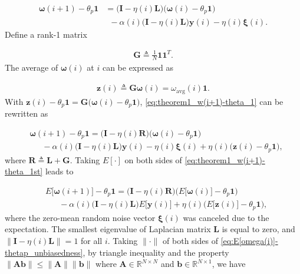 \documentclass[journal]{IEEEtran}
\begin{document}
\vspace{-4mm}
\small
\begin{align}
\bm{\omega}(i+1) - {\theta_p}\mathbf{1} &= \big(\mathbf{I} - \eta(i)\mathbf{L} \big)  \big(\bm{\omega}(i)- {\theta_p}\mathbf{1} \big)\nonumber \\
&\,\,\,- \alpha(i) \big(\mathbf{I} - \eta(i) \mathbf{L}\big)   \mathbf{y}(i) - \eta(i)\bm{\xi}(i).  \label{eq:theorem1_w(i+1)-theta_1}
\end{align}
\normalsize
Define a rank-1 matrix

\vspace{-4mm}
\small
\begin{align}
\mathbf{G} \triangleq \frac{1}{N}\mathbf{1} \mathbf{1}^T. \label{eq:G_definition}
\end{align}
\normalsize
The average of $\bm{\omega}(i)$ at $i$ can be expressed as 

\vspace{-4mm}
\small
\begin{align}
\mathbf{z}(i) \triangleq \mathbf{G} \bm{\omega}(i) = \omega_{\text{avg}}(i)\mathbf{1}. \label{eq:z(i)definition}
\end{align}
\normalsize
With $\mathbf{z}(i)-\theta_p\mathbf{1} = \mathbf{G}\big(\bm{\omega}(i)-\theta_p\mathbf{1}\big)$, \eqref{eq:theorem1_w(i+1)-theta_1} can be rewritten as

\vspace{-4mm}
\small
\begin{align}
&\bm{\omega}(i+1) - {\theta_p}\mathbf{1} = \Big(\mathbf{I} - \eta(i)\mathbf{R} \Big)  \big(\bm{\omega}(i)- {\theta_p}\mathbf{1} \big) \nonumber \\
&\,\,\,\,\,\,\,\,\,- \alpha(i) \Big(\mathbf{I}  - \eta(i) \mathbf{L}\Big)   \mathbf{y}(i) - \eta(i)\bm{\xi}(i) + \eta(i)\big(\mathbf{z}(i)- {\theta_p}\mathbf{1} \big), \label{eq:theorem1_w(i+1)-theta_1st}
\end{align}
\normalsize
where $\mathbf{R} \triangleq \mathbf{L}+\mathbf{G}$. Taking $E\left[\cdot\right]$ on both sides of \eqref{eq:theorem1_w(i+1)-theta_1st} leads to

\vspace{-4mm}
\small
\begin{align}
&E\big[\bm{\omega}(i+1)\big] - {\theta_p}\mathbf{1} = \Big(\mathbf{I} - \eta(i)\mathbf{R}\Big)  \Big(E\big[\bm{\omega}(i)\big] - {\theta_p}\mathbf{1} \Big) \nonumber \\
&\,\,\,\,\,\,\,\,\,\,- \alpha(i) \Big(\mathbf{I} - \eta(i) \mathbf{L}\Big)   E\big[\mathbf{y}(i)\big] +\eta(i) \Big( E\big[\mathbf{z}(i)\big] - \theta_p\mathbf{1}\Big), \label{eq:E[omega(i)]-thetap_unbiasedness}
\end{align}
\normalsize
where the zero-mean random noise vector $\bm{\xi}(i)$ was canceled {}{due to the expectation}. The smallest eigenvalue of Laplacian matrix $\mathbf{L}$ is equal to zero, and $\|\mathbf{I}-\eta(i)\mathbf{L}\|=1$ for all $i$. Taking $\|\cdot\|$ of both sides of \eqref{eq:E[omega(i)]-thetap_unbiasedness}, by triangle inequality {}{and the property $\|\mathbf{A}\mathbf{b}\| \le \|\mathbf{A}\|\|\mathbf{b}\|$ where $\mathbf{A} \in \mathbb{R}^{N \times N}$ and $\mathbf{b} \in \mathbb{R}^{N \times 1}$}, we have
\end{document}
